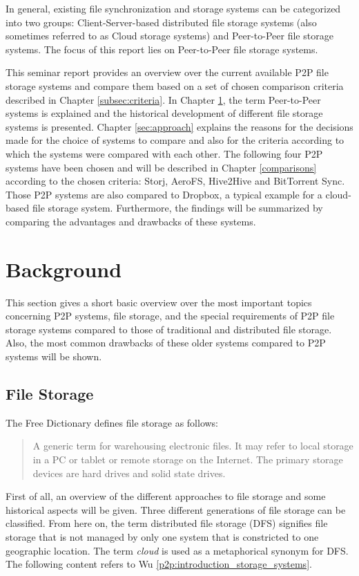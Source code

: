 In general, existing file synchronization and storage systems can be categorized into two groups: Client-Server-based distributed file storage systems (also sometimes referred to as Cloud storage systems) and Peer-to-Peer file storage systems. The focus of this report lies on Peer-to-Peer file storage systems.

This seminar report provides an overview over the current available P2P file storage systems and compare them based on a set of chosen comparison criteria described in Chapter \ref{subsec:criteria}. In Chapter \ref{sec:background}, the term Peer-to-Peer systems is explained and the historical development of different file storage systems is presented. Chapter \ref{sec:approach} explains the reasons for the decisions made for the choice of systems to compare and also for the criteria according to which the systems were compared with each other. The following four P2P systems have been chosen and will be described in Chapter \ref{comparisons} according to the chosen criteria: Storj, AeroFS, Hive2Hive and BitTorrent Sync. Those P2P systems are also compared to Dropbox, a typical example for a cloud-based file storage system. Furthermore, the findings will be summarized by comparing the advantages and drawbacks of these systems.

\section{Background}
\label{sec:background}
This section gives a short basic overview over the most important topics concerning P2P systems, file storage, and the special requirements of P2P file storage systems compared to those of traditional and distributed file storage. Also, the most common drawbacks of these older systems compared to P2P systems will be shown.

\subsection{File Storage}
The Free Dictionary defines file storage as follows:
\begin{quote}
A generic term for warehousing electronic files. It may refer to local storage in a PC or tablet or remote storage on the Internet. The primary storage devices are hard drives and solid state drives. \cite{thefreedictionary}
\end{quote}
First of all, an overview of the different approaches to file storage and some historical aspects will be given. Three different generations of file storage can be classified. From here on, the term distributed file storage (DFS) signifies file storage that is not managed by only one system that is constricted to one geographic location. The term \textit{cloud} is used as a metaphorical synonym for DFS. The following content refers to Wu \ref{p2p:introduction_storage_systems}.

